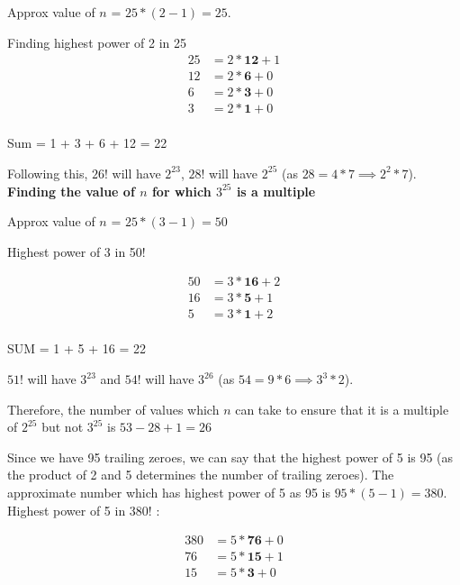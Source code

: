 Approx value of $n$ = $25 * (2 - 1) = 25$.

Finding highest power of 2 in 25
\begin{align*}
    25 &= 2 * \textbf{12} + 1 \\
    12 &= 2 * \textbf{6} + 0 \\
    6 &= 2 * \textbf{3} + 0 \\
    3 &= 2 * \textbf{1} + 0 \\
\end{align*}

Sum = 1 + 3 + 6 + 12 = 22

Following this, $26!$ will have $2^{23}$, \textbf{$28!$} will have $2^{25}$ (as $28 = 4 * 7 \implies 2^2 * 7$). \\

\textbf{Finding the value of $n$ for which $3^{25}$ is a multiple}

Approx value of $n$ = $25 * (3-1) = 50$

Highest power of 3 in 50!

\begin{align*}
    50 &= 3 * \textbf{16} + 2 \\
    16 &= 3 * \textbf{5} + 1 \\
    5 &= 3 * \textbf{1} + 2 \\
\end{align*}

SUM = 1 + 5 + 16 = 22

$51!$ will have $3^{23}$ and \textbf{$54!$} will have $3^{26}$ (as $54 = 9*6 \implies 3^3 * 2$). 

Therefore, the number of values which $n$ can take to ensure that it is a multiple of $2^{25}$ but not $3^{25}$ is $53 - 28 + 1 = 26$


Since we have 95 trailing zeroes, we can say that the highest power of 5 is 95 (as the product of 2 and 5 determines the number of trailing zeroes). The approximate number which has highest power of 5 as 95 is $95 * (5 - 1) = 380$. \\ 

Highest power of 5 in $380!$ : 

\begin{align*}
    380 &= 5 * \textbf{76} + 0 \\
    76 &= 5 *  \textbf{15} + 1 \\
    15 &= 5 *  \textbf{3} + 0 \\
\end{align*}

